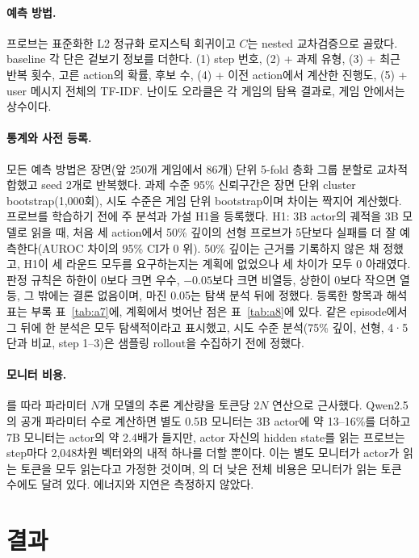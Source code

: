 \documentclass[10pt]{article}
\begin{document}
\paragraph{예측 방법.} 프로브는 표준화한 L2 정규화 로지스틱 회귀이고 $C$는 nested 교차검증으로 골랐다. baseline 각 단은 겉보기 정보를 더한다. (1) step 번호, (2) + 과제 유형, (3) + 최근 반복 횟수, 고른 action의 확률, 후보 수, (4) + 이전 action에서 계산한 진행도, (5) + user 메시지 전체의 TF-IDF.
난이도 오라클은 각 게임의 탐욕 결과로, 게임 안에서는 상수이다.

\paragraph{통계와 사전 등록.}\label{sec:stats} 모든 예측 방법은 장면(앞 250개 게임에서 86개) 단위 5-fold 층화 그룹 분할로 교차적합했고 seed 2개로 반복했다. 과제 수준 95\% 신뢰구간은 장면 단위 cluster bootstrap(1,000회), 시도 수준은 게임 단위 bootstrap이며 차이는 짝지어 계산했다.
프로브를 학습하기 전에 주 분석과 가설 H1을 등록했다. H1: 3B actor의 궤적을 3B 모델로 읽을 때, 처음 세 action에서 50\% 깊이의 선형 프로브가 5단보다 실패를 더 잘 예측한다(AUROC 차이의 95\% CI가 0 위). 50\% 깊이는 근거를 기록하지 않은 채 정했고, H1이 세 라운드 모두를 요구하는지는 계획에 없었으나 세 차이가 모두 0 아래였다.
판정 규칙은 하한이 0보다 크면 우수, $-0.05$보다 크면 비열등, 상한이 0보다 작으면 열등, 그 밖에는 결론 없음이며, 마진 0.05는 탐색 분석 뒤에 정했다. 등록한 항목과 해석표는 부록 표~\ref{tab:a7}에, 계획에서 벗어난 점은 표~\ref{tab:a8}에 있다.
같은 episode에서 그 뒤에 한 분석은 모두 탐색적이라고 표시했고, 시도 수준 분석(75\% 깊이, 선형, 4·5단과 비교, step 1--3)은 샘플링 rollout을 수집하기 전에 정했다.

\paragraph{모니터 비용.} \cite{wang2026failfast}를 따라 파라미터 $N$개 모델의 추론 계산량을 토큰당 $2N$ 연산으로 근사했다. Qwen2.5의 공개 파라미터 수로 계산하면 별도 0.5B 모니터는 3B actor에 약 13--16\%를 더하고 7B 모니터는 actor의 약 2.4배가 들지만, actor 자신의 hidden state를 읽는 프로브는 step마다 2,048차원 벡터와의 내적 하나를 더할 뿐이다. 이는 별도 모니터가 actor가 읽는 토큰을 모두 읽는다고 가정한 것이며, \cite{wang2026failfast}의 더 낮은 전체 비용은 모니터가 읽는 토큰 수에도 달려 있다. 에너지와 지연은 측정하지 않았다.

\section{결과}
\end{document}
